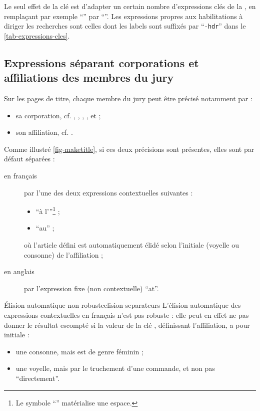 Le seul effet de la clé  est d'adapter un certain nombre
d'expressions clés de la \yatCl{}, en remplaçant par exemple
\enquote{\foreignlanguage{french}{}} par
\enquote{\foreignlanguage{french}{}}. Les
expressions propres aux habilitations à diriger les recherches sont celles dont
les labels sont suffixés par \enquote{\texttt{-hdr}} dans le
\vref{tab-expressions-cles}.

\subsection{Expressions séparant corporations et affiliations des membres du jury}
\label{sec-expr-separ-les}%
%

Sur les pages de titre, chaque membre du jury peut être précisé notamment par :
\begin{itemize}
\item sa corporation, cf. , ,
  , ,
   et  ;
\item son affiliation, cf. .
\end{itemize}
Comme illustré \vref{fig-maketitle}, si ces deux précisions sont présentes,
elles sont par défaut séparées :
\begin{description}
\item[en français] par l'une des deux expressions contextuelles suivantes :
  \begin{itemize}
  \item \enquote{\textvisiblespace{}à l'}\footnote{Le symbole
      \enquote{\textvisiblespace{}} matérialise une espace.} ;
  \item \enquote{\textvisiblespace{}au\textvisiblespace{}} ;
  \end{itemize}
  où l'article défini est automatiquement élidé selon l'initiale (voyelle ou
  consonne) de l'affiliation ;
\item[en anglais] par l'expression fixe (non contextuelle)
  \enquote{\textvisiblespace{}at\textvisiblespace{}}.
\end{description}

\begin{dbwarning}{Élision automatique non robuste}{elision-separateurs}
  L'élision automatique des expressions contextuelles en français n'est pas
  robuste : elle peut en effet ne pas donner le résultat escompté si la valeur
  de la clé , définissant l'affiliation, a pour initiale :
  \begin{itemize}
  \item une consonne, mais est de genre féminin ;
  \item une voyelle, mais par le truchement d'une commande\commandeacronyme, et
    non pas \enquote{directement}.
  \end{itemize}
\end{dbwarning}

